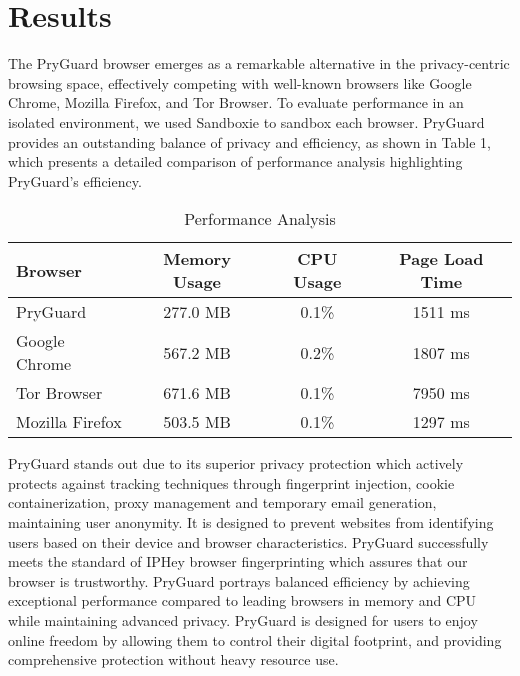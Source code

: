 \documentclass[conference]{IEEEtran}
\begin{document}
\section{Results}
The PryGuard browser emerges as a remarkable alternative in the privacy-centric browsing space, effectively competing with well-known browsers like Google Chrome, Mozilla Firefox, and Tor Browser. To evaluate performance in an isolated environment, we used Sandboxie to sandbox each browser. PryGuard provides an outstanding balance of privacy and efficiency, as shown in Table 1, which presents a detailed comparison of performance analysis highlighting PryGuard’s efficiency.

\begin{table}[h]
\centering
\caption{Performance Analysis}
\begin{tabular}{|l|c|c|c|}
\hline
Browser            & Memory Usage & CPU Usage & Page Load Time \\ \hline
PryGuard          & 277.0 MB     & 0.1\%     & 1511 ms         \\ \hline
Google Chrome     & 567.2 MB     & 0.2\%     & 1807 ms         \\ \hline
Tor Browser       & 671.6 MB     & 0.1\%     & 7950 ms         \\ \hline
Mozilla Firefox    & 503.5 MB     & 0.1\%     & 1297 ms         \\ \hline
\end{tabular}
\end{table}

PryGuard stands out due to its superior privacy protection which actively protects against tracking techniques through fingerprint injection, cookie containerization, proxy management and temporary email generation, maintaining user anonymity. It is designed to prevent websites from identifying users based on their device and browser characteristics. PryGuard successfully meets the standard of IPHey browser fingerprinting which assures that our browser is trustworthy. PryGuard portrays balanced efficiency by achieving exceptional performance compared to leading browsers in memory and CPU while maintaining advanced privacy. PryGuard is designed for users to enjoy online freedom by allowing them to control their digital footprint, and providing comprehensive protection without heavy resource use.
\end{document}
